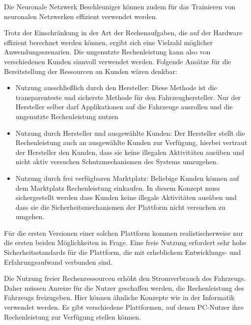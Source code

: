 Die Neuronale Netzwerk Beschleuniger können zudem für das Trainieren von neuronalen Netzwerken effizient verwendet werden. 

Trotz der Einschränkung in der Art der Rechenaufgaben, die auf der Hardware effizient berechnet werden können, ergibt sich eine Vielzahl möglicher Anwendungsszenarien. Die ungenutzte Rechenleistung kann also von verschiedenen Kunden sinnvoll verwendet werden. Folgende Ansätze für die Bereitstellung der Ressourcen an Kunden wären denkbar:

\begin{itemize}
    \item Nutzung ausschließlich durch den Hersteller: Diese Methode ist die transparenteste und sicherste Methode für den Fahrzeughersteller. Nur der Hersteller selber darf Applikationen auf die Fahrzeuge ausrollen und die ungenutzte Rechenleistung nutzen
    \item Nutzung durch Hersteller und ausgewählte Kunden: Der Hersteller stellt die Rechenleistung auch an ausgewählte Kunden zur Verfügung, hierbei vertraut der Hersteller den Kunden, dass sie keine illegalen Aktivitäten ausüben und nicht aktiv versuchen Schutzmechanismen des Systems umzugehen.
    \item Nutzung durch frei verfügbaren Marktplatz: Beliebige Kunden können auf dem Marktplatz Rechenleistung einkaufen. In diesem Konzept muss sichergestellt werden dass Kunden keine illegale Aktivitäten ausüben und dass sie die Sicherheitsmechanismen der Plattform nicht versuchen zu umgehen.
\end{itemize}

Für die ersten Versionen einer solchen Plattform kommen realistischerweise nur die ersten beiden Möglichkeiten in Frage. Eine freie Nutzung erfordert sehr hohe Sicherheitsstandards für die Plattform, die mit erheblichem Entwicklungs- und Erfahrungsaufwand verbunden sind. 

Die Nutzung freier Rechenressourcen erhöht den Stromverbrauch des Fahrzeugs. Daher müssen Anreize für die Nutzer geschaffen werden, die Rechenleistung des Fahrzeugs freizugeben. Hier können ähnliche Konzepte wie in der Informatik verwendet werden. Es gibt verschiedene Plattformen, auf denen PC-Nutzer ihre Rechenleistung zur Verfügung stellen können. 

